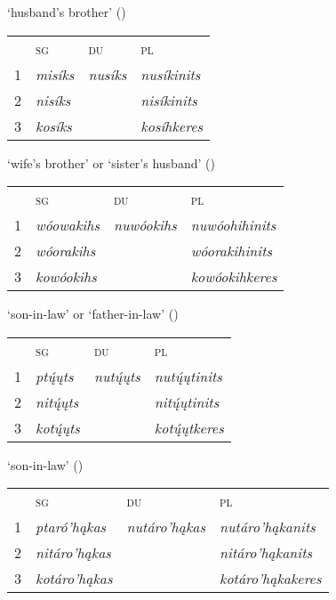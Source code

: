 \begin{exe}
\begin{xlist}
\newpage

\item\label{ListOfKinshipTerms16} `husband's brother' (\Female)

    \begin{tabular}{llll}
    ~ &\textsc{sg}&\textsc{du}&\textsc{pl}\\
    1&  \textit{misíks}&   \textit{nusíks}                                         &\textit{nusíkinits}\\
    2&  \textit{nisíks}&    &\textit{nisíkinits}\\
    3&  \textit{kosíks}&    &\textit{kosíhkeres}
    \end{tabular}

    
\item\label{ListOfKinshipTerms17} `wife's brother' or `sister's husband' (\Male)

    \begin{tabular}{llll}
    ~ &\textsc{sg}&\textsc{du}&\textsc{pl}\\
    1&  \textit{wóowakihs}&   \textit{nuwóokihs}                                         &\textit{nuwóohihinits}\\
    2&  \textit{wóorakihs}&    &\textit{wóorakihinits}\\
    3&  \textit{kowóokihs}&    &\textit{kowóokihkeres}
    \end{tabular}

\item\label{ListOfKinshipTerms18} `son-in-law' or `father-in-law' (\Male)

    \begin{tabular}{llll}
    ~ &\textsc{sg}&\textsc{du}&\textsc{pl}\\
    1&  \textit{ptų́ųts}&   \textit{nutų́ųts}                                         &\textit{nutų́ųtinits}\\
    2&  \textit{nitų́ųts}&    &\textit{nitų́ųtinits}\\
    3&  \textit{kotų́ųts}&    &\textit{kotų́ųtkeres}
    \end{tabular}

\item\label{ListOfKinshipTerms19} `son-in-law' (\Hermaphrodite)

    \begin{tabular}{llll}
    ~ &\textsc{sg}&\textsc{du}&\textsc{pl}\\
    1&  \textit{ptaró'hąkas}&   \textit{nutáro'hąkas}                                         &\textit{nutáro'hąkanits}\\
    2&  \textit{nitáro'hąkas}&    &\textit{nitáro'hąkanits}\\
    3&  \textit{kotáro'hąkas}&    &\textit{kotáro'hąkakeres}
    \end{tabular}
    

\end{xlist}
\end{exe}
